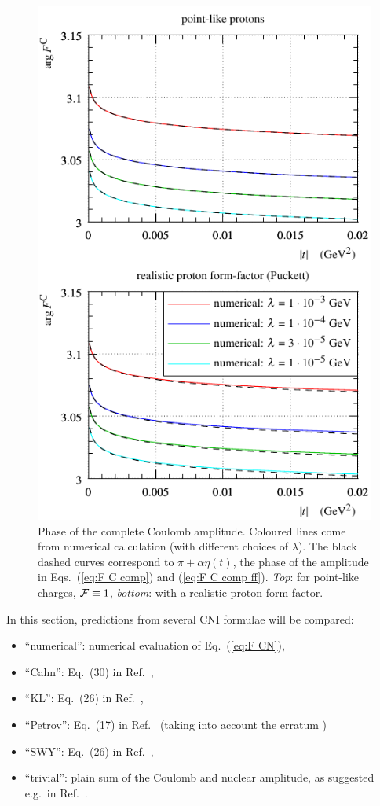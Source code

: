\documentclass{appolb}
\begin{document}
\begin{figure}[h]
\begin{center}
\includegraphics{fig/coul_complete_cmp_lambda_phase.pdf}
\caption{Phase of the complete Coulomb amplitude. Coloured lines come from numerical calculation (with different choices of $\lambda$). The black dashed curves correspond to $\pi + \alpha\eta(t)$, the phase of the amplitude in Eqs.~(\ref{eq:F C comp}) and (\ref{eq:F C comp ff}). {\it Top}: for point-like charges, ${\cal F} \equiv 1$, {\it bottom}: with a realistic proton form factor.}
\label{f:arg F C}
\end{center}
\end{figure}

In this section, predictions from several CNI formulae will be compared:
\begin{itemize}
\item ``numerical'': numerical evaluation of Eq.~(\ref{eq:F CN}),
\item ``Cahn'': Eq.~(30) in Ref.~\cite{cahn82},
\item ``KL'': Eq.~(26) in Ref.~\cite{kl94},
\item ``Petrov'': Eq.~(17) in Ref.~\cite{petrov2018} (taking into account the erratum \cite{petrov2018-erratum})
\item ``SWY'': Eq.~(26) in Ref.~\cite{wy68},
\item ``trivial'': plain sum of the Coulomb and nuclear amplitude, as suggested e.g.~in Ref.~\cite{godizov2019}.
\end{itemize}
\end{document}
